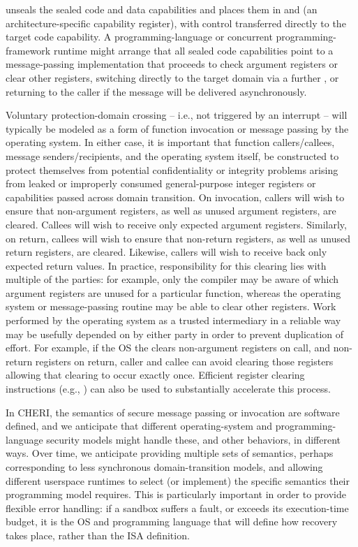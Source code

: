  unseals the sealed code and data capabilities
and places them in \PCC{} and \IDC{} (an architecture-specific
capability register), with control transferred
directly to the target code capability.
A programming-language or concurrent programming-framework runtime might
arrange that all sealed code capabilities point to a message-passing
implementation that proceeds to check argument registers or clear other
registers, switching directly to the target domain via a further
, or returning to the caller if the message will be delivered
asynchronously.

Voluntary protection-domain crossing -- i.e., not triggered by an interrupt --
will typically be modeled as a form of function invocation or message passing
by the operating system.
In either case, it is important that function callers/callees, message
senders/recipients, and the operating system itself, be constructed to protect
themselves from potential confidentiality or integrity problems arising from
leaked or improperly consumed general-purpose integer registers or
capabilities passed across domain transition.
On invocation, callers will wish to ensure that non-argument registers, as
well as unused argument registers, are cleared.
Callees will wish to receive only expected argument registers.
Similarly, on return, callees will wish to ensure that non-return registers,
as well as unused return registers, are cleared.
Likewise, callers will wish to receive back only expected return values.
In practice, responsibility for this clearing lies with multiple of the
parties: for example, only the compiler may be aware of which argument
registers are unused for a particular function, whereas the operating system
or message-passing routine may be able to clear other registers.
Work performed by the operating system as a trusted intermediary in a
reliable way may be usefully depended on by either party in order to prevent
duplication of effort.
For example, if the OS the clears non-argument
registers on call, and non-return registers on return, caller and
callee can avoid clearing those registers allowing that clearing
to occur exactly once.
Efficient register clearing instructions (e.g., ) can
also be used to substantially accelerate this process.

In CHERI, the semantics of secure message passing or invocation are software defined, and we anticipate that different operating-system and programming-language security models might handle these, and other behaviors, in different ways.
Over time, we anticipate providing multiple sets of semantics, perhaps corresponding to less synchronous domain-transition models, and allowing different userspace runtimes to select (or implement) the specific semantics their programming model requires.
This is particularly important in order to provide flexible error handling: if a sandbox suffers a fault, or exceeds its execution-time budget, it is the OS and programming language that will define how recovery takes place, rather than the ISA definition.

